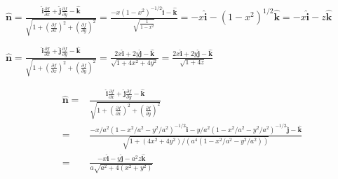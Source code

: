 \documentclass{article}
\begin{document}
\begin{homeworkProblem}
{\begin{enumerate}[label=(\alph*)]
\begin{item}
			\end{item}
			\begin{item}
				$\displaystyle\hat{\mathbf{n}}=\frac{\hat{\mathbf{i}}\frac{\partial f}{\partial x}+\hat{\mathbf{j}}\frac{\partial f}{\partial y}-\hat{\mathbf{k}}}{\sqrt{1+\left(\frac{\partial f}{\partial x}\right)^2+\left(\frac{\partial f}{\partial y}\right)^2}}=\frac{-x(1-x^2)^{-1/2}\hat{\mathbf{i}}-\hat{\mathbf{k}}}{\sqrt{\frac{1}{1-x^2}}}=-x\hat{\mathbf{i}}-(1-x^2)^{1/2}\hat{\mathbf{k}}=-x\hat{\mathbf{i}}-z\hat{\mathbf{k}}$
			\end{item}
			\begin{item}
				$\displaystyle\hat{\mathbf{n}}=\frac{\hat{\mathbf{i}}\frac{\partial f}{\partial x}+\hat{\mathbf{j}}\frac{\partial f}{\partial y}-\hat{\mathbf{k}}}{\sqrt{1+\left(\frac{\partial f}{\partial x}\right)^2+\left(\frac{\partial f}{\partial y}\right)^2}}=\frac{2x\hat{\mathbf{i}}+2y\hat{\mathbf{j}}-\hat{\mathbf{k}}}{\sqrt{1+4x^2+4y^2}}=\frac{2x\hat{\mathbf{i}}+2y\hat{\mathbf{j}}-\hat{\mathbf{k}}}{\sqrt{1+4z}}$
			\end{item}
			\begin{item}
				\begin{align*}
					\displaystyle\hat{\mathbf{n}}=&\frac{\hat{\mathbf{i}}\frac{\partial f}{\partial x}+\hat{\mathbf{j}}\frac{\partial f}{\partial y}-\hat{\mathbf{k}}}{\sqrt{1+\left(\frac{\partial f}{\partial x}\right)^2+\left(\frac{\partial f}{\partial y}\right)^2}} \\
					=&\frac{-x/a^2(1-x^2/a^2-y^2/a^2)^{-1/2}\hat{\mathbf{i}}-y/a^2(1-x^2/a^2-y^2/a^2)^{-1/2}\hat{\mathbf{j}}-\hat{\mathbf{k}}}{\sqrt{1+(4x^2+4y^2)/(a^4(1-x^2/a^2-y^2/a^2))}} \\
					=&\frac{-x\hat{\mathbf{i}}-y\hat{\mathbf{j}}-a^2z\hat{\mathbf{k}}}{a\sqrt{a^2+4(x^2+y^2)}}
				\end{align*}
			\end{item}
		\end{enumerate}
	}
\end{homeworkProblem}

\end{document}
